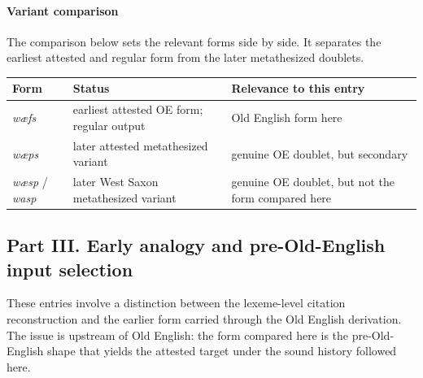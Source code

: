 \documentclass[
  british,
  a4paper,
]{article}
\newcounter{none} %
\begin{document}
\paragraph{Variant comparison}\label{variant-comparison-3}

The comparison below sets the relevant forms side by side. It separates
the earliest attested and regular form from the later metathesized
doublets.

{\def\LTcaptype{none} %
\begin{longtable}[]{@{}
  >{\raggedright\arraybackslash}p{}
  >{\raggedright\arraybackslash}p{}
  >{\raggedright\arraybackslash}p{}@{}}
\toprule\noalign{}
\begin{minipage}[b]{\linewidth}\raggedright
Form
\end{minipage} & \begin{minipage}[b]{\linewidth}\raggedright
Status
\end{minipage} & \begin{minipage}[b]{\linewidth}\raggedright
Relevance to this entry
\end{minipage} \\
\midrule\noalign{}
\endhead
\bottomrule\noalign{}
\endlastfoot
\emph{wæfs} & earliest attested OE form; regular output & Old English
form here \\
\emph{wæps} & later attested metathesized variant & genuine OE doublet,
but secondary \\
\emph{wæsp} / \emph{wasp} & later West Saxon metathesized variant &
genuine OE doublet, but not the form compared here \\
\end{longtable}
}

\clearpage

\subsection{Part III. Early analogy and pre-Old-English input
selection}\label{part-iii.-early-analogy-and-pre-old-english-input-selection}

These entries involve a distinction between the lexeme-level citation
reconstruction and the earlier form carried through the Old English
derivation. The issue is upstream of Old English: the form compared here
is the pre-Old-English shape that yields the attested target under the
sound history followed here.
\end{document}

